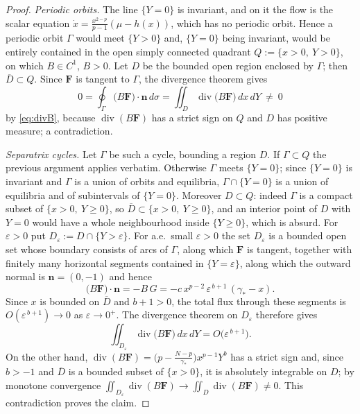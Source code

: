 \documentclass[11pt,reqno]{amsart}
\numberwithin{equation}{section}
\theoremstyle{plain}
\theoremstyle{definition}
\newcommand{\eps}{\varepsilon}
\newcommand{\gs}{\gamma_{*}}
\DeclareMathOperator{\dv}{div}
\begin{document}
\begin{proof}
\emph{Periodic orbits.} The line $\{Y=0\}$ is invariant, and on it the flow is
the scalar equation $\dot x=\frac{x^{2-p}}{p-1}(\mu-h(x))$, which has no
periodic orbit. Hence a periodic orbit $\Gamma$ would meet $\{Y>0\}$ and,
$\{Y=0\}$ being invariant, would be entirely contained in the open simply
connected quadrant $Q:=\{x>0,\ Y>0\}$, on which $B\in C^{1}$, $B>0$. Let $D$ be
the bounded open region enclosed by $\Gamma$; then $\overline D\subset Q$. Since
$\mathbf F$ is tangent to $\Gamma$, the divergence theorem gives
\[
0=\oint_{\Gamma}\big(B\mathbf F\big)\cdot\mathbf n\,d\sigma
=\iint_{D}\dv\big(B\mathbf F\big)\,dx\,dY\ \ne\ 0
\]
by \eqref{eq:divB}, because $\dv(B\mathbf F)$ has a strict sign on $Q$ and $D$
has positive measure; a contradiction.

\smallskip
\emph{Separatrix cycles.} Let $\Gamma$ be such a cycle, bounding a region $D$.
If $\Gamma\subset Q$ the previous argument applies verbatim. Otherwise
$\Gamma$ meets $\{Y=0\}$; since $\{Y=0\}$ is invariant and $\Gamma$ is a union
of orbits and equilibria, $\Gamma\cap\{Y=0\}$ is a union of equilibria and of
subintervals of $\{Y=0\}$. Moreover $D\subset Q$: indeed $\Gamma$ is a compact
subset of $\{x>0,\ Y\ge0\}$, so $\overline D\subset\{x>0,\ Y\ge0\}$, and an
interior point of $D$ with $Y=0$ would have a whole neighbourhood inside
$\{Y\ge0\}$, which is absurd. For $\eps>0$ put
$D_{\eps}:=D\cap\{Y>\eps\}$. For a.e.\ small $\eps>0$ the set $D_{\eps}$ is a
bounded open set whose boundary consists of arcs of $\Gamma$, along which
$\mathbf F$ is tangent, together with finitely many horizontal segments
contained in $\{Y=\eps\}$, along which the outward normal is $\mathbf n=(0,-1)$
and hence
\[
\big(B\mathbf F\big)\cdot\mathbf n=-B\,G
=-c\,x^{p-2}\,\eps^{\,b+1}\,(\gs-x).
\]
Since $x$ is bounded on $\overline D$ and $b+1>0$, the total flux through these
segments is $O(\eps^{\,b+1})\to0$ as $\eps\to0^{+}$. The divergence theorem on
$D_{\eps}$ therefore gives
\[
\iint_{D_{\eps}}\dv\big(B\mathbf F\big)\,dx\,dY=O\big(\eps^{\,b+1}\big).
\]
On the other hand, $\dv(B\mathbf F)=\big(p-\frac{N-p}{\gs}\big)x^{p-1}Y^{b}$ has
a strict sign and, since $b>-1$ and $\overline D$ is a bounded subset of
$\{x>0\}$, it is absolutely integrable on $D$; by monotone convergence
$\iint_{D_{\eps}}\dv(B\mathbf F)\to\iint_{D}\dv(B\mathbf F)\ne0$. This
contradiction proves the claim.
\end{proof}
\end{document}
